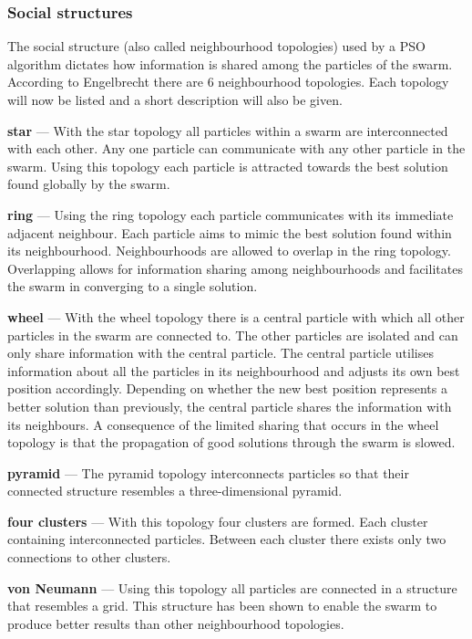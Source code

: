 \subsubsection{Social structures}
The  social structure (also called neighbourhood topologies) used by a \gls{PSO} algorithm dictates how information is shared among the particles of the swarm. According to Engelbrecht\cite{FundamentalSwarm} there are 6 neighbourhood topologies. Each topology will now be listed and a short description will also be given.
\begin{description}
\item{\textbf{star}} --- With the star topology all particles within a swarm are interconnected with each other. Any one particle can communicate with any other particle in the swarm\cite{FundamentalSwarm}. Using this topology each particle is attracted towards the best solution found globally by the swarm\cite{FundamentalSwarm}. 
\item{\textbf{ring}} --- Using the ring topology each particle communicates with its immediate adjacent neighbour\cite{FundamentalSwarm}. Each particle aims to mimic the best solution found within its neighbourhood\cite{FundamentalSwarm}. Neighbourhoods are allowed to overlap in the ring topology\cite{FundamentalSwarm}. Overlapping allows for information sharing among neighbourhoods and facilitates the swarm in converging to a single solution\cite{FundamentalSwarm}. 
\item{\textbf{wheel}} --- With the wheel topology there is a central particle with which all other particles in the swarm are connected to\cite{FundamentalSwarm}. The other particles are isolated and can only share information with the central particle\cite{FundamentalSwarm}. The central particle utilises information about all the particles in its neighbourhood and adjusts its own best position accordingly\cite{FundamentalSwarm}. Depending on whether the new best position represents a better solution than previously, the central particle shares the information with its neighbours\cite{FundamentalSwarm}. A consequence of the limited sharing that occurs in the wheel topology is that the propagation of good solutions through the swarm is slowed\cite{FundamentalSwarm}.
\item{\textbf{pyramid}} --- The pyramid topology interconnects particles so that their connected structure resembles a three-dimensional pyramid\cite{FundamentalSwarm}.
\item{\textbf{four clusters}} --- With this topology four clusters are formed. Each cluster containing interconnected particles\cite{FundamentalSwarm}. Between each cluster there exists only two connections to other clusters\cite{FundamentalSwarm}.
\item{\textbf{von Neumann}} --- Using this topology all particles are connected in a structure that resembles a grid\cite{FundamentalSwarm}. This structure has been shown to enable the swarm to produce better results than other neighbourhood topologies\cite{FundamentalSwarm}.
\end{description}

